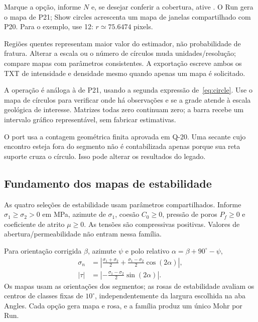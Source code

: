 Marque a opção, informe \(N\) e, se desejar conferir a cobertura, ative . O Run gera o mapa de P21; Show circles acrescenta um mapa de janelas compartilhado com P20. Para o exemplo, use 12: \(r\simeq75.6474\) pixels.

Regiões quentes representam maior valor do estimador, não probabilidade de fratura. Alterar a escala ou o número de círculos muda unidades/resolução; compare mapas com parâmetros consistentes. A exportação escreve ambos os TXT de intensidade e densidade mesmo quando apenas um mapa é solicitado.

A operação é análoga à de P21, usando a segunda expressão de~\eqref{eq:circle}. Use o mapa de círculos para verificar onde há observações e se a grade atende à escala geológica de interesse. Matrizes todas zero continuam zero; a barra recebe um intervalo gráfico representável, sem fabricar estimativas.

O port usa a contagem geométrica finita aprovada em Q-20. Uma secante cujo encontro esteja fora do segmento não é contabilizada apenas porque sua reta suporte cruza o círculo. Isso pode alterar os resultados do legado.

\subsection{Fundamento dos mapas de estabilidade}\label{sec:stress}
As quatro seleções de estabilidade usam parâmetros compartilhados. Informe \(\sigma_1\geq\sigma_2>0\) em MPa, azimute de \(\sigma_1\), coesão \(C_0\geq0\), pressão de poros \(P_f\geq0\) e coeficiente de atrito \(\mu\geq0\). As tensões são compressivas positivas. Valores de abertura/permeabilidade não entram nessa família.

Para orientação corrigida \(\beta\), azimute \(\psi\) e polo relativo \(\alpha=\beta+90^\circ-\psi\),
\begin{align}
\sigma_n&=\left|\frac{\sigma_1+\sigma_2}{2}
+\frac{\sigma_1-\sigma_2}{2}\cos(2\alpha)\right|,\\
|\tau|&=\left|-\frac{\sigma_1-\sigma_2}{2}\sin(2\alpha)\right|.
\label{eq:stress}
\end{align}
Os mapas usam as orientações dos segmentos; as rosas de estabilidade avaliam os centros de classes fixas de \(10^\circ\), independentemente da largura escolhida na aba Angles. Cada opção gera mapa e rosa, e a família produz um único Mohr por Run.

